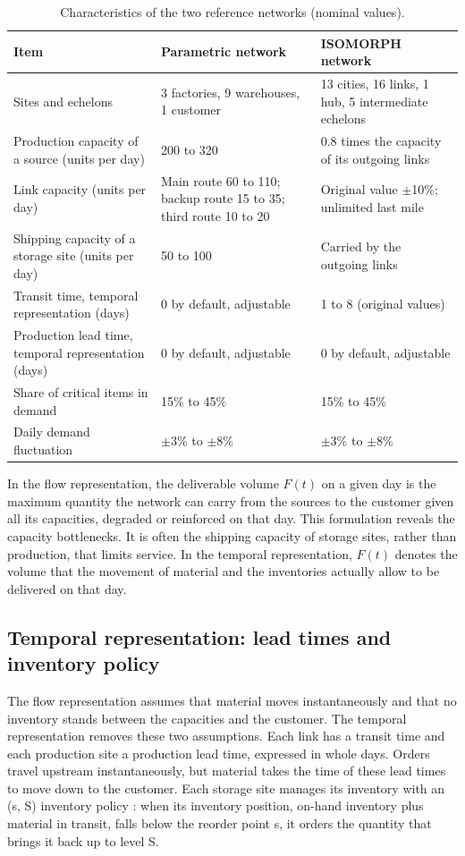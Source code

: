 \begin{table}[htbp]
\caption{Characteristics of the two reference networks (nominal values).}
\label{tab:reseaux}
\footnotesize
\begin{tabularx}{\textwidth}{@{}P{4.2cm}LL@{}}
\toprule
\textbf{Item} & \textbf{Parametric network} & \textbf{ISOMORPH network} \\
\midrule
Sites and echelons & 3 factories, 9 warehouses, 1 customer & 13 cities, 16 links, 1 hub, 5 intermediate echelons \\
Production capacity of a source (units per day) & 200 to 320 & 0.8 times the capacity of its outgoing links \\
Link capacity (units per day) & Main route 60 to 110; backup route 15 to 35; third route 10 to 20 & Original value $\pm$10\%; unlimited last mile \\
Shipping capacity of a storage site (units per day) & 50 to 100 & Carried by the outgoing links \\
Transit time, temporal representation (days) & 0 by default, adjustable & 1 to 8 (original values) \\
Production lead time, temporal representation (days) & 0 by default, adjustable & 0 by default, adjustable \\
Share of critical items in demand & 15\% to 45\% & 15\% to 45\% \\
Daily demand fluctuation & $\pm$3\% to $\pm$8\% & $\pm$3\% to $\pm$8\% \\
\bottomrule
\end{tabularx}
\end{table}

In the flow representation, the deliverable volume $F(t)$ on a given day is the maximum quantity the network can carry from the sources to the customer given all its capacities, degraded or reinforced on that day. This formulation reveals the capacity bottlenecks. It is often the shipping capacity of storage sites, rather than production, that limits service. In the temporal representation, $F(t)$ denotes the volume that the movement of material and the inventories actually allow to be delivered on that day.

\subsection{Temporal representation: lead times and inventory policy}
\label{sec:S3.2}

The flow representation assumes that material moves instantaneously and that no inventory stands between the capacities and the customer. The temporal representation removes these two assumptions. Each link has a transit time and each production site a production lead time, expressed in whole days. Orders travel upstream instantaneously, but material takes the time of these lead times to move down to the customer. Each storage site manages its inventory with an (s, S) inventory policy \citep{scarf1960}: when its inventory position, on-hand inventory plus material in transit, falls below the reorder point s, it orders the quantity that brings it back up to level S.

